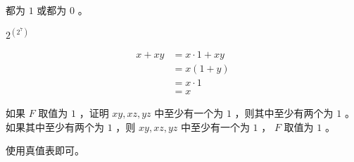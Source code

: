 {{        %
        \begin{practices}
            
        \end{practices}

        \begin{practices}
            
        \end{practices}

        \begin{practices}
            都为 $1$ 或都为 $0$ 。
        \end{practices}

        \begin{practices}
            $2^{(2^7)}$
        \end{practices}

        \begin{practices}
            \begin{align*}
                x + xy
                &= x \cdot 1 + xy \\
                &= x(1 + y) \\
                &= x \cdot 1 \\
                &= x
            \end{align*}
        \end{practices}

        \begin{practices}
            如果 $F$ 取值为 $1$ ，证明 $xy, xz, yz$ 中至少有一个为 $1$ ，则其中至少有两个为 $1$ 。
            如果其中至少有两个为 $1$ ，则 $xy, xz, yz$ 中至少有一个为 $1$ ， $F$ 取值为 $1$ 。
        \end{practices}

        \begin{practices}
            使用真值表即可。
        \end{practices}

        \begin{practices}

        \end{practices}

        \begin{practices}

        \end{practices}

        \begin{practices}


\end{practices}}}
